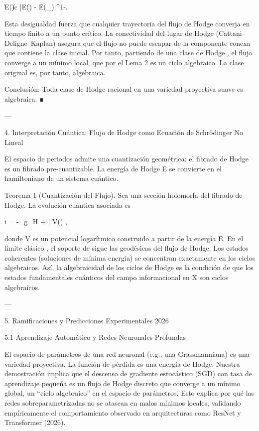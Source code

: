 \documentclass[12pt,twoside]{book}
\begin{document}
\|\nabla E(\alpha)\| \ge c |E(\alpha) - E(\alpha_\infty)|^{1-\theta}.

Esta desigualdad fuerza que cualquier trayectoria del flujo de Hodge converja en tiempo finito a un punto crítico. La conectividad del lugar de Hodge (Cattani–Deligne–Kaplan) asegura que el flujo no puede escapar de la componente conexa que contiene la clase inicial. Por tanto, partiendo de una clase de Hodge \alpha, el flujo converge a un mínimo local, que por el Lema 2 es un ciclo algebraico. La clase original \alpha es, por tanto, algebraica.

Conclusión: Toda clase de Hodge racional en una variedad proyectiva suave es algebraica. ∎

---

4. Interpretación Cuántica: Flujo de Hodge como Ecuación de Schrödinger No Lineal

El espacio de periodos admite una cuantización geométrica: el fibrado de Hodge es un fibrado pre‑cuantizable. La energía de Hodge E se convierte en el hamiltoniano de un sistema cuántico.

Teorema 1 (Cuantización del Flujo). Sea \Psi una sección holomorfa del fibrado de Hodge. La evolución cuántica asociada es

i\hbar {} = -\Delta_{g_H} \Psi + \partial\bar{\partial} V(\Psi) \Psi,

donde V es un potencial logarítmico construido a partir de la energía E. En el límite clásico \hbar {}, el soporte de \Psi sigue las geodésicas del flujo de Hodge. Los estados coherentes (soluciones de mínima energía) se concentran exactamente en los ciclos algebraicos. Así, la algebraicidad de los ciclos de Hodge es la condición de que los estados fundamentales cuánticos del campo informacional en X son ciclos algebraicos.

---

5. Ramificaciones y Predicciones Experimentales 2026

5.1 Aprendizaje Automático y Redes Neuronales Profundas

El espacio de parámetros de una red neuronal (e.g., una Grassmanniana) es una variedad proyectiva. La función de pérdida es una energía de Hodge. Nuestra demostración implica que el descenso de gradiente estocástico (SGD) con tasa de aprendizaje pequeña es un flujo de Hodge discreto que converge a un mínimo global, un “ciclo algebraico” en el espacio de parámetros. Esto explica por qué las redes sobreparametrizadas no se atascan en malos mínimos locales, validando empíricamente el comportamiento observado en arquitecturas como ResNet y Transformer (2026).
\end{document}
